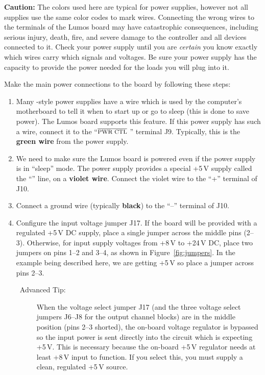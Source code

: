 \documentclass[letterpaper,twoside,onecolumn,openright,final]{memoir}
\begin{document}
{\bfseries Caution:}
The colors used here are typical for  power supplies, however
not all supplies use the same color codes to mark wires.  Connecting the wrong wires to the terminals
of the Lumos board may have catastrophic consequences, including serious injury, death, fire, and severe damage
to the controller and all devices connected to it.  Check your power supply until you are \emph{certain} you know
exactly which wires carry which signals and voltages.  Be sure your power supply has the capacity to provide the
power needed for the loads you will plug into it.

Make the main power connections to the board by following these steps:

\begin{enumerate}
	\item	Many -style power supplies have a wire which is used by the computer's motherboard
		to tell it when to start up or go to sleep (this is done to save power).  The Lumos
		board supports this feature.  If this power supply has such a wire, 
		connect it to the ``$\overline{\hbox{\mc{PWR CTL}}}$ '' terminal
		J9.  Typically, this is the {\bfseries green wire} from the power supply.  

\newpage
	\item	We need to make sure the Lumos board is powered even if the power supply is in %
		``sleep'' %
		mode.  The power supply provides a special +5\,V supply called the 
		``'' line,
		on a {\bfseries violet wire}.  Connect the violet wire to the ``+'' terminal of J10.

	\item	Connect a ground wire (typically {\bfseries black}) to the ``--'' terminal of J10.

	\item\label{s:pwrjump}
		Configure the input voltage jumper J17.  If the board will be provided with a regulated
		+5\,V DC supply, place a single jumper across the middle pins (2--3).  Otherwise, for input 
		supply voltages from +8\,V to +24\,V DC, place two jumpers on pins 1--2 and 3--4,
		as shown in Figure~\ref{fig:jumpers}.  In the example being described here, we are
		getting +5\,V so place a jumper across pins 2--3.
		\begin{description}
			\item[\HandRight\ Advanced Tip:] 
				When the voltage select jumper J17 (and the three voltage select
				jumpers J6--J8 for the output channel blocks) are in the middle position
				(pins 2--3 shorted), the on-board voltage regulator is bypassed so the
				input power is sent directly into the circuit which is expecting +5\,V.
				This is necessary because the on-board +5\,V regulator needs at least
				+8\,V input to function.  If you select this, you must supply a clean,
				regulated +5\,V source.


\end{description}
\end{enumerate}
\end{document}
